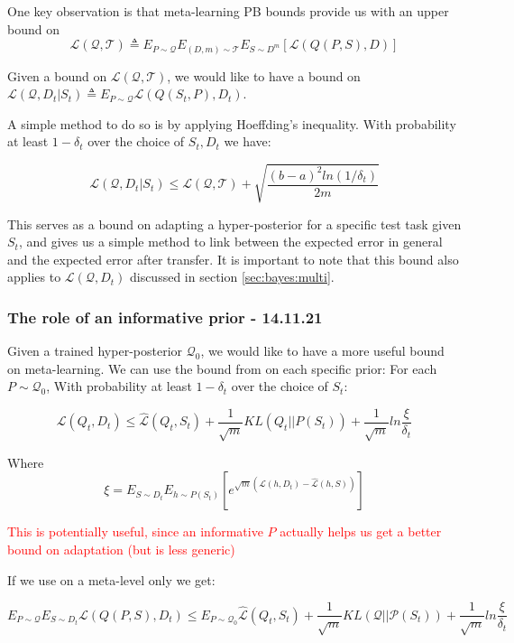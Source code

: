 \documentclass[letterpaper]{article}
\theoremstyle{definition}
\begin{document}
One key observation is that meta-learning PB bounds provide us with an upper bound on $$\mathcal{L}(\mathcal{Q}, \mathcal{T})\triangleq E_{P\sim \mathcal{Q}}E_{(D, m)\sim \mathcal{T}}E_{S\sim D^m}\left [\mathcal{L}(Q(P, S), D)\right ]$$

Given a bound on $\mathcal{L}(\mathcal{Q}, \mathcal{T})$, we would like to have a bound on $\mathcal{L}(\mathcal{Q}, D_t|S_t)\triangleq E_{P\sim \mathcal{Q}}\mathcal{L}(Q(S_t, P), D_t)$.

A simple method to do so is by applying Hoeffding's inequality. With probability at least $1-\delta_t$ over the choice of $S_t, D_t$ we have:

\begin{equation}
\mathcal{L}(\mathcal{Q}, D_t|S_t) \leq \mathcal{L}(\mathcal{Q}, \mathcal{T}) + \sqrt{\frac{(b-a)^2 ln(1/\delta_t)}{2m}}
\end{equation}

This serves as a bound on adapting a hyper-posterior for a specific test task given $S_t$, and gives us a simple method to link between the expected error in general and the expected error after transfer. It is important to note that this bound also applies to $\mathcal{L}(\mathcal{Q}, D_t)$ discussed in section \ref{sec:bayes:multi}.

\subsubsection{The role of an informative prior - 14.11.21}

Given a trained hyper-posterior $\mathcal{Q}_0$, we would like to have a more useful bound on meta-learning. We can use the bound from \cite{Rivasplata2020} on each specific prior:
For each $P\sim \mathcal{Q}_0$, With probability at least $1-\delta_t$ over the choice of $S_t$: 

$$\mathcal{L}(Q_t, D_t) \leq \hat{\mathcal{L}}(Q_t, S_t) + \frac{1}{\sqrt{m}}KL(Q_t|| P(S_t)) + \frac{1}{\sqrt{m}}ln\frac{\xi}{\delta_t}$$

Where $$\xi=E_{S\sim D_t}E_{h\sim P(S_t)}\left [e^{\sqrt{m}(\mathcal{L}(h, D_t)-\hat{\mathcal{L}}(h, S))} \right ]$$

\textcolor{red}{This is potentially useful, since an informative $P$ actually helps us get a better bound on adaptation (but is less generic) }

If we use \cite{Rivasplata2020} on a meta-level only we get:

 $$E_{P\sim \mathcal{Q}}E_{S\sim D_t}\mathcal{L}(Q(P, S), D_t) \leq E_{P\sim \mathcal{Q}_0}\hat{\mathcal{L}}(Q_t, S_t) + \frac{1}{\sqrt{m}}KL(\mathcal{Q}|| \mathcal{P}(S_t)) + \frac{1}{\sqrt{m}}ln\frac{\xi}{\delta_t}$$
 
\end{document}
